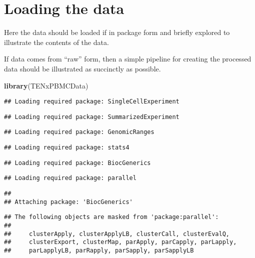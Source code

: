 \documentclass[]{book}
\newenvironment{Shaded}{\begin{snugshade}}{\end{snugshade}}
\newcommand{\KeywordTok}[1]{\textcolor[rgb]{0.13,0.29,0.53}{\textbf{#1}}}
\newcommand{\NormalTok}[1]{#1}
\begin{document}
\hypertarget{loading-the-data-1}{%
\section{Loading the data}\label{loading-the-data-1}}

Here the data should be loaded if in package form and briefly explored to illustrate the contents of the data.

If data comes from ``raw'' form, then a simple pipeline for creating the processed data should be illustrated as succinctly as possible.

\begin{Shaded}
\begin{Highlighting}[]
\KeywordTok{library}\NormalTok{(TENxPBMCData)}
\end{Highlighting}
\end{Shaded}

\begin{verbatim}
## Loading required package: SingleCellExperiment
\end{verbatim}

\begin{verbatim}
## Loading required package: SummarizedExperiment
\end{verbatim}

\begin{verbatim}
## Loading required package: GenomicRanges
\end{verbatim}

\begin{verbatim}
## Loading required package: stats4
\end{verbatim}

\begin{verbatim}
## Loading required package: BiocGenerics
\end{verbatim}

\begin{verbatim}
## Loading required package: parallel
\end{verbatim}

\begin{verbatim}
## 
## Attaching package: 'BiocGenerics'
\end{verbatim}

\begin{verbatim}
## The following objects are masked from 'package:parallel':
## 
##     clusterApply, clusterApplyLB, clusterCall, clusterEvalQ,
##     clusterExport, clusterMap, parApply, parCapply, parLapply,
##     parLapplyLB, parRapply, parSapply, parSapplyLB
\end{verbatim}
\end{document}
